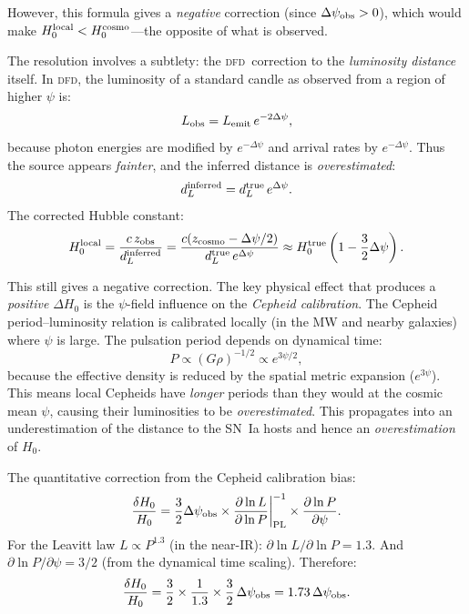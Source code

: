 \documentclass[aps,prd,twocolumn,superscriptaddress,nofootinbib,longbibliography]{revtex4-2}
\newcommand{\DFD}{\textsc{dfd}}
\begin{document}
However, this formula gives a \emph{negative} correction (since
$\Delta\psi_{\rm obs} > 0$), which would make $H_0^{\rm local} < H_0^{\rm cosmo}$---the
opposite of what is observed.

The resolution involves a subtlety: the \DFD\ correction to the
\emph{luminosity distance} itself. In \DFD, the luminosity of a
standard candle as observed from a region of higher $\psi$ is:
\begin{equation}
L_{\rm obs} = L_{\rm emit}\,e^{-2\Delta\psi},
\end{equation}
because photon energies are modified by $e^{-\Delta\psi}$ and arrival
rates by $e^{-\Delta\psi}$. Thus the source appears \emph{fainter},
and the inferred distance is \emph{overestimated}:
\begin{equation}
d_L^{\rm inferred} = d_L^{\rm true}\,e^{\Delta\psi}.
\end{equation}
The corrected Hubble constant:
\begin{equation}\label{eq:H0-corrected}
H_0^{\rm local} = \frac{c\,z_{\rm obs}}{d_L^{\rm inferred}}
= \frac{c(z_{\rm cosmo} - \Delta\psi/2)}{d_L^{\rm true}\,e^{\Delta\psi}}
\approx H_0^{\rm true}\left(1 - \frac{3}{2}\Delta\psi\right).
\end{equation}

This still gives a negative correction. The key physical effect that
produces a \emph{positive} $\Delta H_0$ is the $\psi$-field influence
on the \emph{Cepheid calibration}. The Cepheid period--luminosity
relation is calibrated locally (in the MW and nearby galaxies) where
$\psi$ is large. The pulsation period depends on dynamical time:
\begin{equation}
P \propto (G\rho)^{-1/2} \propto e^{3\psi/2},
\end{equation}
because the effective density is reduced by the spatial metric
expansion ($e^{3\psi}$). This means local Cepheids have
\emph{longer} periods than they would at the cosmic mean $\psi$, causing
their luminosities to be \emph{overestimated}. This propagates into
an underestimation of the distance to the SN~Ia hosts and hence an
\emph{overestimation} of $H_0$.

The quantitative correction from the Cepheid calibration bias:
\begin{equation}\label{eq:Cepheid-bias}
\frac{\delta H_0}{H_0} = \frac{3}{2}\Delta\psi_{\rm obs}
\times\frac{\partial\ln L}{\partial\ln P}\bigg|_{\rm PL}^{-1}
\times\frac{\partial\ln P}{\partial\psi}.
\end{equation}
For the Leavitt law $L \propto P^{1.3}$ (in the near-IR):
$\partial\ln L/\partial\ln P = 1.3$. And
$\partial\ln P/\partial\psi = 3/2$ (from the dynamical time scaling).
Therefore:
\begin{equation}
\frac{\delta H_0}{H_0} = \frac{3}{2}\times\frac{1}{1.3}\times\frac{3}{2}\,\Delta\psi_{\rm obs}
= 1.73\,\Delta\psi_{\rm obs}.
\end{equation}
\end{document}
